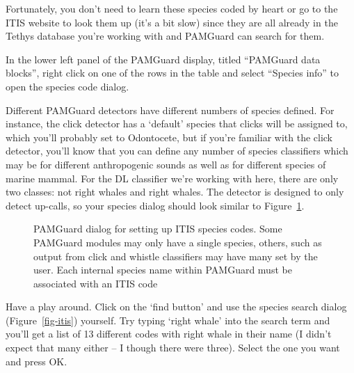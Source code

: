 \documentclass[
]{article}
\begin{document}
Fortunately, you don't need to learn these species coded by heart or go
to the ITIS website to look them up (it's a bit slow) since they are all
already in the Tethys database you're working with and PAMGuard can
search for them.

In the lower left panel of the PAMGuard display, titled ``PAMGuard data
blocks'', right click on one of the rows in the table and select
``Species info'' to open the species code dialog.

Different PAMGuard detectors have different numbers of species defined.
For instance, the click detector has a `default' species that clicks
will be assigned to, which you'll probably set to Odontocete, but if
you're familiar with the click detector, you'll know that you can define
any number of species classifiers which may be for different
anthropogenic sounds as well as for different species of marine mammal.
For the DL classifier we're working with here, there are only two
classes: not right whales and right whales. The detector is designed to
only detect up-calls, so your species dialog should look similar to
Figure~\ref{fig-speciescodes}.

\begin{figure}


\caption{\label{fig-speciescodes}PAMGuard dialog for setting up ITIS
species codes. Some PAMGuard modules may only have a single species,
others, such as output from click and whistle classifiers may have many
set by the user. Each internal species name within PAMGuard must be
associated with an ITIS code}

\end{figure}%

Have a play around. Click on the `find button' and use the species
search dialog (Figure~\ref{fig-itis}) yourself. Try typing `right whale'
into the search term and you'll get a list of 13 different codes with
right whale in their name (I didn't expect that many either -- I though
there were three). Select the one you want and press OK.
\end{document}
